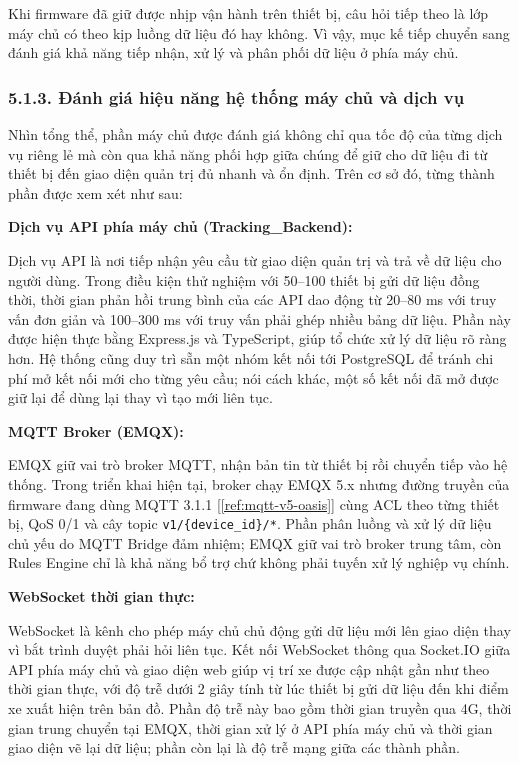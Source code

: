 \documentclass[a4paper]{extarticle}
\newcommand{\ieeecite}[1]{[\ref{#1}]}
\providecommand{\parencite}[1]{\ieeecite{#1}}
\begin{document}
Khi firmware đã giữ được nhịp vận hành trên thiết bị, câu hỏi tiếp theo
là lớp máy chủ có theo kịp luồng dữ liệu đó hay không. Vì vậy, mục kế
tiếp chuyển sang đánh giá khả năng tiếp nhận, xử lý và phân phối dữ liệu
ở phía máy chủ.


\subsubsection{5.1.3. Đánh giá hiệu năng hệ thống máy chủ
và dịch vụ}\label{513-ux111uxe1nh-giuxe1-hiux1ec7u-nux103ng-hux1ec7-thux1ed1ng-ux111uxe1m-muxe2y-cloud}

Nhìn tổng thể, phần máy chủ được đánh giá không chỉ qua tốc độ của từng
dịch vụ riêng lẻ mà còn qua khả năng phối hợp giữa chúng để giữ cho dữ
liệu đi từ thiết bị đến giao diện quản trị đủ nhanh và ổn định. Trên cơ sở đó,
từng thành phần được xem xét như sau:

\textbf{Dịch vụ API phía máy chủ (Tracking\_Backend):}

Dịch vụ API là nơi tiếp nhận yêu cầu từ giao diện quản trị và trả về dữ
liệu cho người dùng. Trong điều kiện thử nghiệm với 50--100 thiết bị gửi
dữ liệu đồng thời, thời gian phản hồi trung bình của các API dao động từ
20--80 ms với truy vấn đơn giản và 100--300 ms với truy vấn phải ghép
nhiều bảng dữ liệu. Phần này được hiện thực bằng Express.js và
TypeScript, giúp tổ chức xử lý dữ liệu rõ ràng hơn. Hệ thống cũng duy
trì sẵn một nhóm kết nối tới PostgreSQL để tránh chi phí mở kết nối mới
cho từng yêu cầu; nói cách khác, một số kết nối đã mở được giữ lại để
dùng lại thay vì tạo mới liên tục.

\textbf{MQTT Broker (EMQX):}

EMQX giữ vai trò broker MQTT, nhận bản tin từ thiết bị rồi chuyển tiếp
vào hệ thống. Trong triển khai hiện tại, broker chạy EMQX 5.x nhưng
đường truyền của firmware đang dùng MQTT 3.1.1
\parencite{ref:mqtt-v5-oasis} cùng ACL theo từng thiết bị, QoS 0/1 và
cây topic \texttt{v1/\{device\_id\}/*}. Phần phân luồng và xử lý dữ liệu
chủ yếu do MQTT Bridge đảm nhiệm; EMQX giữ vai trò broker trung tâm, còn
Rules Engine chỉ là khả năng bổ trợ chứ không phải tuyến xử lý nghiệp vụ
chính.

\textbf{WebSocket thời gian thực:}

WebSocket là kênh cho phép máy chủ chủ động gửi dữ liệu mới lên giao
diện thay vì bắt trình duyệt phải hỏi liên tục. Kết nối WebSocket thông
qua Socket.IO giữa API phía máy chủ và giao diện web giúp vị trí xe được cập nhật gần
như theo thời gian thực, với độ trễ dưới 2 giây tính từ lúc thiết bị gửi
dữ liệu đến khi điểm xe xuất hiện trên bản đồ. Phần độ trễ này bao gồm
thời gian truyền qua 4G, thời gian trung chuyển tại EMQX, thời gian xử
lý ở API phía máy chủ và thời gian giao diện vẽ lại dữ liệu; phần còn lại là độ
trễ mạng giữa các thành phần.
\end{document}
